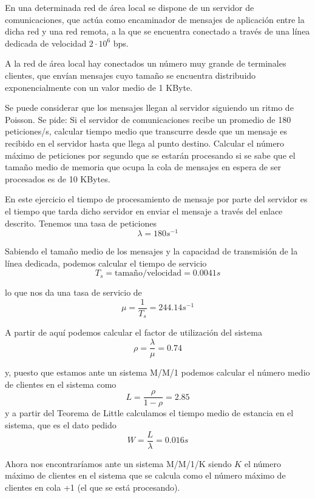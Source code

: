 
\begin{problem}[6]
En una determinada red de área local se dispone de un servidor de comunicaciones, que actúa como encaminador de mensajes de aplicación entre la dicha red y una red remota, a la que se encuentra conectado a través de una línea dedicada de velocidad $2\cdot 10^6$ bps.

A la red de área local hay conectados un número muy grande de terminales clientes, que envían mensajes cuyo tamaño se encuentra distribuido exponencialmente con un valor medio de 1 KByte.

Se puede considerar que los mensajes llegan al servidor siguiendo un ritmo de Poisson. Se pide:
\ppart Si el servidor de comunicaciones recibe un promedio de 180 peticiones/s, calcular tiempo medio que transcurre desde que un mensaje es recibido en el servidor hasta que llega al punto destino.
\ppart Calcular el número máximo de peticiones por segundo que se estarán procesando si se sabe que el tamaño medio de memoria que ocupa la cola de mensajes en espera de ser procesados es de 10 KBytes.

\solution

\yoP


En este ejercicio el tiempo de procesamiento de mensaje por parte del servidor es el tiempo que tarda dicho servidor en enviar el mensaje a través del enlace descrito.
\spart
Tenemos una tasa de peticiones
\[λ = 180 s^{-1}\]

Sabiendo el tamaño medio de los mensajes y la capacidad de transmisión de la línea dedicada, podemos calcular el tiempo de servicio
\[T_s = \text{tamaño}/\text{velocidad} = 0.0041s\]

lo que nos da una tasa de servicio de
\[μ=\frac{1}{T_s}=244.14 s^{-1}\]

A partir de aquí podemos calcular el factor de utilización del sistema
\[ρ = \frac{λ}{μ}=0.74\]

y, puesto que estamos ante un sistema M/M/1 podemos calcular el número medio de clientes en el sistema como
\[L = \frac{ρ}{1-ρ}=2.85\]
y a partir del Teorema de Little calculamos el tiempo medio de estancia en el sistema, que es el dato pedido
\[W= \frac{L}{λ}= \boxed{0.016s}\]

\spart
Ahora nos encontraríamos ante un sistema M/M/1/K siendo $K$ el número máximo de clientes en el sistema que se calcula como el número máximo de clientes en cola +1 (el que se está procesando).


\end{problem}
